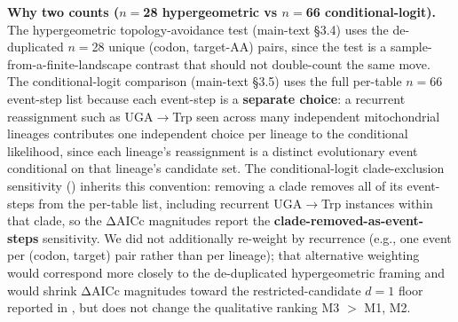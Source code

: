 \documentclass[preprint,11pt,authoryear,a4paper]{elsarticle}
\begin{document}
\textbf{Why two counts (\(n =\)28 hypergeometric vs \(n =\)66
conditional-logit).} The hypergeometric topology-avoidance test
(main-text §3.4) uses the de-duplicated \(n =\)28 unique (codon,
target-AA) pairs, since the test is a sample-from-a-finite-landscape
contrast that should not double-count the same move. The
conditional-logit comparison (main-text §3.5) uses the full per-table
\(n =\)66 event-step list because each event-step is a \textbf{separate
choice}: a recurrent reassignment such as UGA\(\rightarrow\)Trp seen
across many independent mitochondrial lineages contributes one
independent choice per lineage to the conditional likelihood, since each
lineage's reassignment is a distinct evolutionary event conditional on
that lineage's candidate set. The conditional-logit clade-exclusion
sensitivity () inherits this convention:
removing a clade removes all of its event-steps from the per-table list,
including recurrent UGA\(\rightarrow\)Trp instances within that clade,
so the ΔAICc magnitudes report the \textbf{clade-removed-as-event-steps}
sensitivity. We did not additionally re-weight by recurrence (e.g., one
event per (codon, target) pair rather than per lineage); that
alternative weighting would correspond more closely to the de-duplicated
hypergeometric framing and would shrink ΔAICc magnitudes toward the
restricted-candidate \(d = 1\) floor reported in
, but does not change the qualitative
ranking M3 \(>\) M1, M2.
\end{document}
